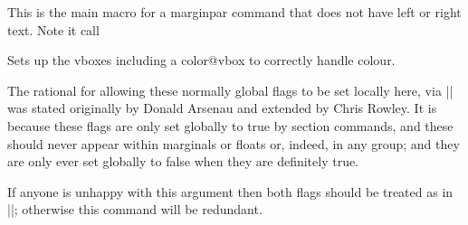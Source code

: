  \begin{macro}{\@xmpar}
    \begin{teX}
\long{}
    \end{teX}
 \end{macro}

This is the main macro for a marginpar command that does not have left or
right text. Note it call 
 \begin{macro}{\@ympar}
    \begin{teX}
\long{}
    \end{teX}
 \end{macro}
 
 \begin{macro}{\@savemarbox}
 Sets up the vboxes including a color@vbox to correctly handle colour. 
    \begin{teX}
\long{}
    \end{teX}
  \end{macro}
 

 
\begin{macro}{\@marginparreset}
%
 The rational for allowing these normally global flags to be set
 locally here, via |\@parboxrestore| was stated originally by
 Donald Arsenau and extended by Chris Rowley.
 It is because these flags are only set globally to
 true by section commands, and these should never appear within
 marginals or floats or, indeed, in any group; and they are only ever
 set globally to false when they are definitely true.

 If anyone is unhappy with this argument then both flags should be
 treated as in |\set@nobreak|; otherwise this command will be
 redundant. 
    \begin{teX}
\def \@marginparreset {%
        \reset@font
        \normalsize
        \@setminipage
}
    \end{teX}
\end{macro}
%
 \begin{macro}{\@xympar}
%
\begin{teX}
\def \@xympar{%
  \ifnum\@floatpenalty <\z@\@cons\@currlist\@marbox\fi
  \setbox\@tempboxa
    \color@vbox
      \vbox \bgroup
  \end@float
  \@ignorefalse
  \@esphack
}
    \end{teX}
 \end{macro}

